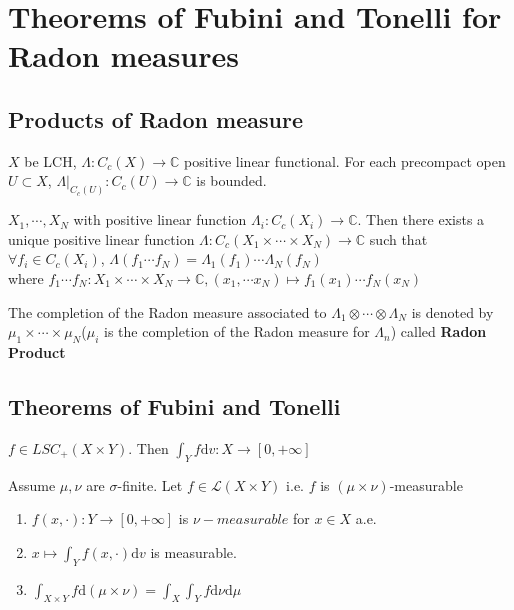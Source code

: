 \section{Theorems of Fubini and Tonelli for Radon measures}
\subsection{Products of Radon measure}
\begin{lemma}
     $ X  $ be LCH,  $ \Lambda:C_c(X)\rightarrow\mathbb{C} $ positive linear functional. For each precompact open  $ U\subset X  $,  $ \Lambda|_{C_c(U)}:C_c(U)\rightarrow \mathbb{C} $ is bounded.  
\end{lemma}
\begin{theorem}
     $ X_1,\cdots,X_N  $ with positive linear function  $ \Lambda_i:C_c(X_i)\rightarrow \mathbb{C} $. Then there exists a unique positive linear function  $ \Lambda:C_c(X_1\times\cdots\times X_N)\rightarrow \mathbb{C} $ such that   $ \forall f_i\in C_c(X_i) $, $ \Lambda(f_1\cdots f_N)=\Lambda_1(f_1)\cdots\Lambda_N(f_N)  $ \\where  $ f_1\cdots f_N:X_1\times\cdots\times X_N\rightarrow \mathbb{C}, (x_1,\cdots x_N)\mapsto f_1(x_1)\cdots f_N(x_N) $ 
\end{theorem}
\begin{definition}
    The completion of the Radon measure associated to  $ \Lambda_1\otimes\cdots\otimes\Lambda_N  $ is denoted by  $ \mu_1\times\cdots\times\mu_N $($ \mu_i $ is the completion of the Radon measure for  $ \Lambda_n $)  called \textbf{Radon Product}
\end{definition}
\subsection{Theorems of Fubini and Tonelli}
\begin{theorem}
     $ f\in LSC_+(X\times Y) $. Then  $ \int_Y f\mathrm{d}v:X\rightarrow[0,+\infty] $  
\end{theorem}
\begin{theorem}
     Assume  $ \mu,\nu  $ are  $ \sigma $-finite. Let  $ f\in \mathcal{L}(X\times Y)  $ i.e.  $ f  $ is  $ (\mu\times \nu) $-measurable
     \begin{enumerate}[$ (a) $]
         \item  $ f(x,\cdot):Y\rightarrow [0,+\infty] $ is  $ \nu-measurable $ for  $ x\in X $ a.e.
         \item  $ x\mapsto \int_{Y}f(x,\cdot)\mathrm{d}v  $ is measurable.
         \item  $ \int_{X\times Y} f\mathrm{d}(\mu\times \nu)=\int_X\int_Yf\mathrm{d}\nu\mathrm{d}\mu$ 
     \end{enumerate} 
\end{theorem}